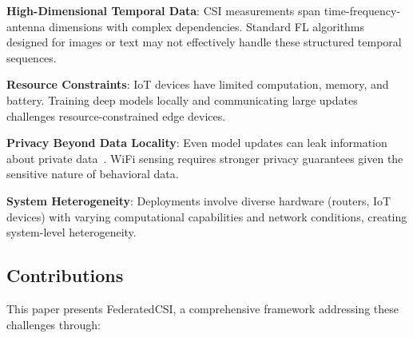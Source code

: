 \documentclass[journal]{IEEEtran}
\begin{document}
\textbf{High-Dimensional Temporal Data}: CSI measurements span time-frequency-antenna dimensions with complex dependencies. Standard FL algorithms designed for images or text may not effectively handle these structured temporal sequences.

\textbf{Resource Constraints}: IoT devices have limited computation, memory, and battery. Training deep models locally and communicating large updates challenges resource-constrained edge devices.

\textbf{Privacy Beyond Data Locality}: Even model updates can leak information about private data~\cite{melis2019exploiting}. WiFi sensing requires stronger privacy guarantees given the sensitive nature of behavioral data.

\textbf{System Heterogeneity}: Deployments involve diverse hardware (routers, IoT devices) with varying computational capabilities and network conditions, creating system-level heterogeneity.

\subsection{Contributions}

This paper presents FederatedCSI, a comprehensive framework addressing these challenges through:
\end{document}
